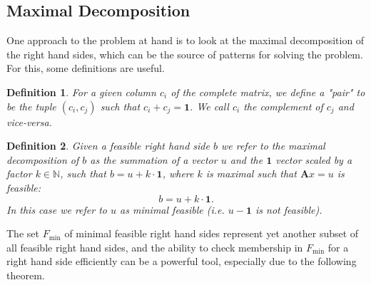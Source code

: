 \documentclass{article}
\newtheorem{definition}{Definition}
\begin{document}
\subsection{Maximal Decomposition}
One approach to the problem at hand is to look at the maximal decomposition of the right hand sides, which can be the source of patterns for solving the problem. For this, some definitions are useful.
\begin{adjustwidth}{10pt}{10pt}
\begin{definition}
    For a given column $c_i$ of the complete matrix, we define a "pair" to be the tuple $(c_i, c_j)$ such that $c_i + c_j = \mathbf{1}$. We call $c_i$ the complement of $c_j$ and vice-versa. 
\end{definition}
\begin{definition}
    Given a feasible right hand side $b$ we refer to the maximal decomposition of $b$ as the summation of a vector $u$ and the $\mathbf{1}$ vector scaled by a factor $k\in \mathbb{N}$, such that $b = u + k\cdot \mathbf{1}$, where $k$ is maximal such that $\mathbf{A}x = u$ is feasible:
    \[
    b = u + k\cdot \mathbf{1}
    .\]
    In this case we refer to $u$ as minimal feasible (i.e. $u - \mathbf{1}$ is not feasible).
\end{definition}
\end{adjustwidth}
The set $F_{\min}$ of minimal feasible right hand sides represent yet another subset of all feasible right hand sides, and the ability to check membership in $F_{\min}$ for a right hand side efficiently can be a powerful tool, especially due to the following theorem.
\end{document}

